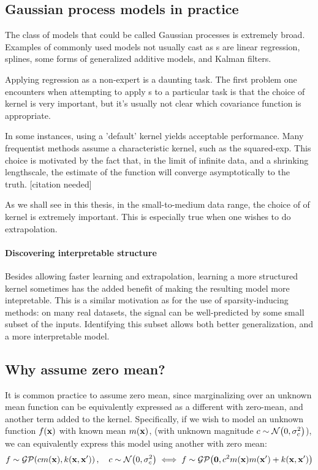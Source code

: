 \subsection{Gaussian process models in practice}

The class of models that could be called Gaussian processes is extremely broad.
Examples of commonly used models not usually cast as \gp{}s are linear regression, splines, some forms of generalized additive models, and Kalman filters.

Applying \gp{} regression as a non-expert is a daunting task.
The first problem one encounters when attempting to apply \gp{}s to a particular task is that the choice of kernel is very important, but it's usually not clear which covariance function is appropriate.

In some instances, using a 'default' kernel yields acceptable performance.
Many frequentist methods assume a characteristic kernel, such as the squared-exp.
This choice is motivated by the fact that, in the limit of infinite data, and a shrinking lengthscale, the estimate of the function will converge asymptotically to the truth. [citation needed]

As we shall see in this thesis, in the small-to-medium data range, the choice of of kernel is extremely important.
This is especially true when one wishes to do extrapolation.


\paragraph{Discovering interpretable structure}
Besides allowing faster learning and extrapolation, learning a more structured kernel sometimes has the added benefit of making the resulting model more intepretable.
This is a similar motivation as for the use of sparsity-inducing methods:  on many real datasets, the signal can be well-predicted by some small subset of the inputs.  Identifying this subset allows both better generalization, and a more interpretable model.




\subsection{Why assume zero mean?}

It is common practice to assume zero mean, since marginalizing over an unknown mean function can be equivalently expressed as a different \gp{} with zero-mean, and another term added to the kernel.
Specifically, if we wish to model an unknown function $f({\bf{x}})$ with known mean $m({\bf{x}})$, (with unknown magnitude $c \sim \mathcal{N}\!\left(0,\sigma^2_c\right)$), we can equivalently express this model using another \gp{} with zero mean:
%
\begin{align}
f \sim \mathcal{GP}\!\left(c m({\bf{x}}),k({\bf{x}},{\bf{x}}')\right), \quad c \sim \mathcal{N}\!\left(0,\sigma^2_c\right)
\iff f \sim \mathcal{GP}\!\left( {\bf{0}} , c^2 m({\bf{x}}) m({\bf{x}}') + k({\bf{x}},{\bf{x}}')\right)
\end{align}

